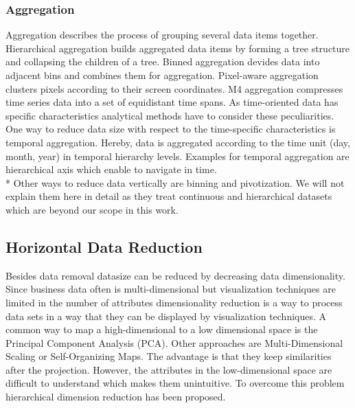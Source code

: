 \subsubsection*{Aggregation}
Aggregation describes the process of grouping several data items together. Hierarchical aggregation builds aggregated data items by forming a tree structure and collapsing the children of a tree\cite{elmqvist2010hierarchical}. Binned aggregation devides data into adjacent bins and combines them for aggregation\cite{Liu2013}. Pixel-aware aggregation clusters pixels according to their screen coordinates\cite{li2016polyspector}. M4 aggregation compresses time series data into a set of equidistant time spans\cite{jugel2014m4}.
As time-oriented data has specific characteristics analytical methods have to consider these peculiarities. One way to reduce data size with respect to the time-specific characteristics is temporal aggregation. Hereby, data is aggregated according to the time unit (day, month, year) in temporal hierarchy levels. Examples for temporal aggregation are hierarchical axis \cite{Chung2014} which enable to navigate in time. 
\\*
Other ways to reduce data vertically are binning and pivotization. We will not explain them here in detail as they treat continuous and hierarchical datasets which are beyond our scope in this work. 

\subsection{Horizontal Data Reduction}
Besides data removal datasize can be reduced by decreasing data dimensionality. Since business data often is multi-dimensional but visualization techniques are limited in the number of attributes dimensionality reduction is a way to process data sets in a way that they can be displayed by visualization techniques. A common way to map a high-dimensional to a low dimensional space is the Principal Component Analysis (PCA)\cite{Aigner2008}. Other approaches are Multi-Dimensional Scaling or Self-Organizing Maps\cite{PiringerHarald2011}. The advantage is that they keep similarities after the projection. However, the attributes in the low-dimensional space are difficult to understand which makes them unintuitive. To overcome this problem hierarchical dimension reduction has been proposed. 



